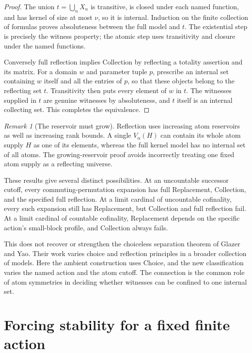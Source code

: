 \documentclass[11pt,letterpaper]{article}
\numberwithin{equation}{section}
\theoremstyle{plain}
\theoremstyle{definition}
\theoremstyle{remark}
\newtheorem{remark}[remark]{Remark}
\begin{document}
\begin{proof}
The union $t=\bigcup_n X_n$ is transitive, is closed under each named function, and has kernel of size at most $\nu$, so it is internal. Induction on the finite collection of formulas proves absoluteness between the full model and $t$. The existential step is precisely the witness property; the atomic step uses transitivity and closure under the named functions.

Conversely full reflection implies Collection by reflecting a totality assertion and its matrix. For a domain $w$ and parameter tuple $p$, prescribe an internal set containing $w$ itself and all the entries of $p$, so that these objects belong to the reflecting set $t$. Transitivity then puts every element of $w$ in $t$. The witnesses supplied in $t$ are genuine witnesses by absoluteness, and $t$ itself is an internal collecting set. This completes the equivalence.
\end{proof}

\begin{remark}[The reservoir must grow]
Reflection uses increasing atom reservoirs as well as increasing rank bounds. A single $V_\alpha(H)$ can contain its whole atom supply $H$ as one of its elements, whereas the full kernel model has no internal set of all atoms. The growing-reservoir proof avoids incorrectly treating one fixed atom supply as a reflecting universe.
\end{remark}

These results give several distinct possibilities. At an uncountable successor cutoff, every commuting-permutation expansion has full Replacement, Collection, and the specified full reflection. At a limit cardinal of uncountable cofinality, every such expansion still has Replacement, but Collection and full reflection fail. At a limit cardinal of countable cofinality, Replacement depends on the specific action's small-block profile, and Collection always fails.

This does not recover or strengthen the choiceless separation theorem of Glazer and Yao. Their work varies choice and reflection principles in a broader collection of models. Here the ambient construction uses Choice, and the new classification varies the named action and the atom cutoff. The connection is the common role of atom symmetries in deciding whether witnesses can be confined to one internal set.

\section{Forcing stability for a fixed finite action}\label{nee:ca:sec:forcing}
\end{document}

